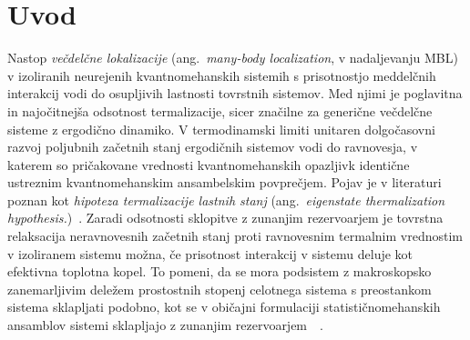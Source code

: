 % 
\chapter{Uvod}
Nastop \emph{večdelčne lokalizacije} (ang.~\emph{many-body localization}, v nadaljevanju MBL) v izoliranih neurejenih kvantnomehanskih sistemih s prisotnostjo meddelčnih interakcij vodi do osupljivih lastnosti tovrstnih sistemov. Med njimi je poglavitna in najočitnejša odsotnost termalizacije, sicer značilne za generične večdelčne sisteme z ergodično dinamiko. V termodinamski limiti unitaren dolgočasovni razvoj poljubnih začetnih stanj ergodičnih sistemov vodi do ravnovesja, v katerem so pričakovane vrednosti kvantnomehanskih opazljivk identične ustreznim kvantnomehanskim ansambelskim povprečjem. Pojav je v literaturi poznan kot \emph{hipoteza termalizacije lastnih stanj} (ang.~\emph{eigenstate thermalization hypothesis.})~\cite{d2016quantum}. Zaradi odsotnosti sklopitve z zunanjim rezervoarjem je tovrstna relaksacija neravnovesnih začetnih stanj proti ravnovesnim termalnim vrednostim v izoliranem sistemu možna, če prisotnost interakcij v sistemu deluje kot efektivna toplotna kopel. To pomeni, da se mora podsistem z makroskopsko zanemarljivim deležem prostostnih stopenj  celotnega sistema s preostankom sistema sklapljati podobno, kot se v običajni formulaciji statističnomehanskih ansamblov sistemi sklapljajo z zunanjim rezervoarjem~\cite{abanin2018ergodicity}~\cite{nandkishore2015many}. \\\\
